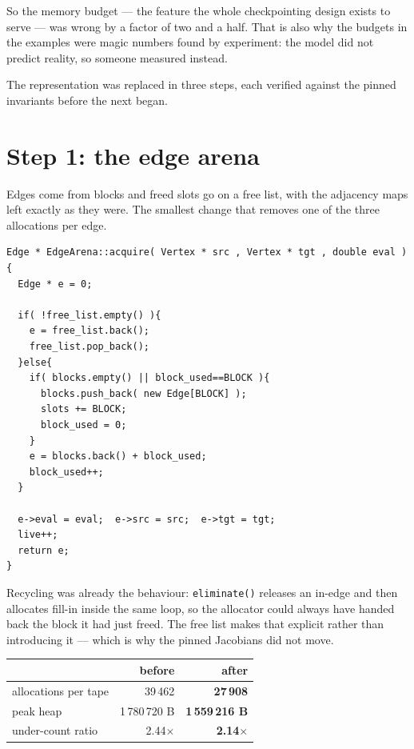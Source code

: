\documentclass[11pt,a4paper]{report}
\newcommand{\code}[1]{\texttt{#1}}
\begin{document}
\noindent
So the memory budget --- the feature the whole checkpointing design exists to
serve --- was wrong by a factor of two and a half. That is also why the budgets
in the examples were magic numbers found by experiment: the model did not
predict reality, so someone measured instead.

The representation was replaced in three steps, each verified against the pinned
invariants before the next began.

\section{Step 1: the edge arena}

Edges come from blocks and freed slots go on a free list, with the adjacency
maps left exactly as they were. The smallest change that removes one of the
three allocations per edge.

\begin{lstlisting}
Edge * EdgeArena::acquire( Vertex * src , Vertex * tgt , double eval )
{
  Edge * e = 0;

  if( !free_list.empty() ){
    e = free_list.back();
    free_list.pop_back();
  }else{
    if( blocks.empty() || block_used==BLOCK ){
      blocks.push_back( new Edge[BLOCK] );
      slots += BLOCK;
      block_used = 0;
    }
    e = blocks.back() + block_used;
    block_used++;
  }

  e->eval = eval;  e->src = src;  e->tgt = tgt;
  live++;
  return e;
}
\end{lstlisting}

Recycling was already the behaviour: \code{eliminate()} releases an in-edge and
then allocates fill-in inside the same loop, so the allocator could always have
handed back the block it had just freed. The free list makes that explicit
rather than introducing it --- which is why the pinned Jacobians did not move.

\begin{center}
\begin{tabular}{@{}lrr@{}}
\toprule
 & before & after \\
\midrule
allocations per tape & 39\,462 & \textbf{27\,908} \\
peak heap            & 1\,780\,720 B & \textbf{1\,559\,216 B} \\
under-count ratio    & 2.44$\times$ & \textbf{2.14$\times$} \\
\bottomrule
\end{tabular}
\end{center}
\end{document}
